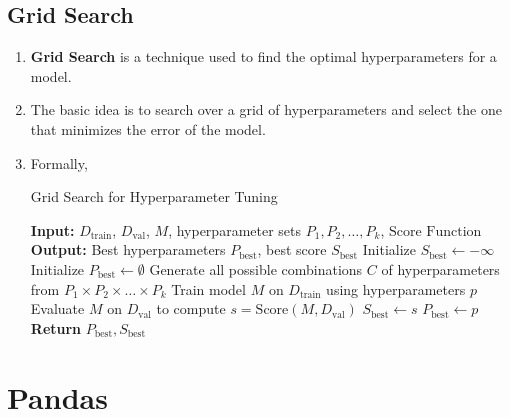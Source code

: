 \documentclass[letterpaper, 11pt]{article}
\newcommand{\1}{\mathds{1}}	%
\theoremstyle{definition}
\begin{document}
\subsection{Grid Search}
\begin{enumerate}
    \item \textbf{Grid Search} is a technique used to find the optimal hyperparameters for a model.
    \item The basic idea is to search over a grid of hyperparameters and select the one that minimizes the error of the model.
    \item Formally,
    \begin{algorithm}
        \caption{Grid Search for Hyperparameter Tuning}
        \begin{algorithmic}[1] %
        \State \textbf{Input:} \( D_{\text{train}} \), \( D_{\text{val}} \), \( M \), hyperparameter sets \( P_1, P_2, \dots, P_k \),  \( \text{Score Function} \)
        \State \textbf{Output:} Best hyperparameters \( P_{\text{best}} \), best score \( S_{\text{best}} \)
        \State Initialize \( S_{\text{best}} \gets -\infty \) 
        \State Initialize \( P_{\text{best}} \gets \emptyset \)
        \State Generate all possible combinations \( C \) of hyperparameters from \( P_1 \times P_2 \times \dots \times P_k \) 
         
            \State Train model \( M \) on \( D_{\text{train}} \) using hyperparameters \( p \)
            \State Evaluate \( M \) on \( D_{\text{val}} \) to compute \( s = \text{Score}(M, D_{\text{val}}) \)
                \State \( S_{\text{best}} \gets s \)
                \State \( P_{\text{best}} \gets p \)
            \EndIf
        \EndFor
        \State \textbf{Return} \( P_{\text{best}}, S_{\text{best}} \)
        \end{algorithmic}
        \end{algorithm}
\end{enumerate}

\subsection{}

\section{Pandas}
\end{document}
